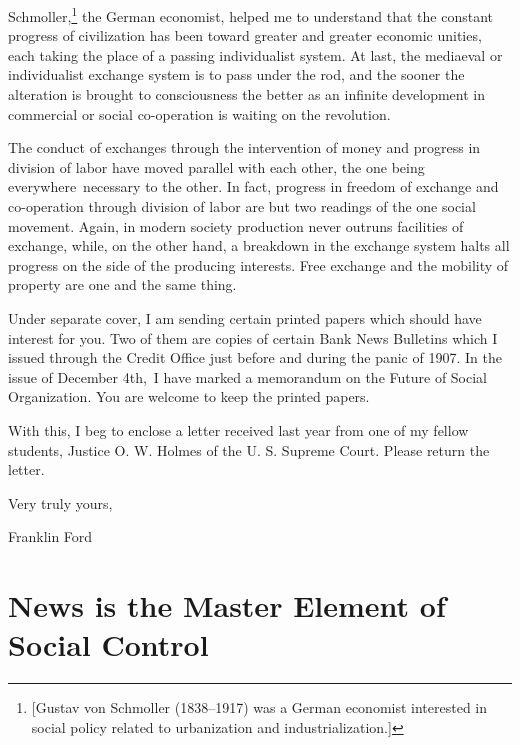 \documentclass[openany,nobib]{tufte-book}
\let\oldchapter\chapter
\def\chapter{%
  \setcounter{footnote}{0}%
  \oldchapter
}
\begin{document}
Schmoller,\footnote{{[}Gustav von Schmoller (1838--1917) was a German
  economist interested in social policy related to urbanization and
  industrialization.{]}} the German economist, helped me to understand
that the constant progress of civilization has been toward greater and
greater economic unities, each taking the place of a passing
individualist system. At last, the mediaeval or individualist exchange
system is to pass under the rod, and the sooner the alteration is
brought to consciousness the better as an infinite development in
commercial or social co-operation is waiting on the revolution.~

The conduct of exchanges through the intervention of money and progress
in division of labor have moved parallel with each other, the one being
everywhere~necessary to the other. In fact, progress in freedom of
exchange and co-operation through division of labor are but two readings
of the one social movement. Again, in modern society production never
outruns facilities of exchange, while, on the other hand, a breakdown in
the exchange system halts all progress on the side of the producing
interests. Free exchange and the mobility of property are one and the
same thing.~

Under separate cover, I am sending certain printed papers which should
have interest for you. Two of them are copies of certain Bank News
Bulletins which I issued through the Credit Office just before and
during the panic of 1907. In the issue of December 4th,~I have marked a
memorandum on the Future of Social Organization. You are welcome to keep
the printed papers.~

With this, I beg to enclose a letter received last year from one of my
fellow students, Justice O. W. Holmes of the U. S. Supreme Court. Please
return the letter.

\vspace{0.2in}

\begin{center}
    
{\large Very truly yours,}

\vspace{0.1in}

\hspace{0.3in} {\large Franklin Ford}

\end{center}

\chapter[News is the Master Element of Social Control]{News is the Master Element of Social Control}
\label{ch:News is the Master Element of Social Control}
\end{document}
